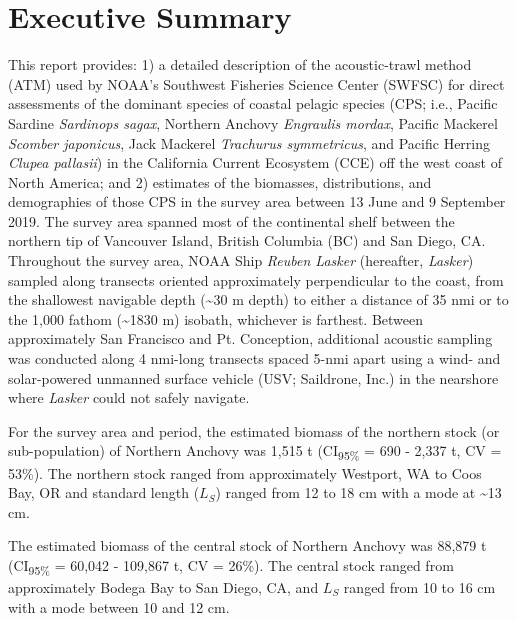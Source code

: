 \documentclass[]{article}
\title{}
\author{}
\date{}
\begin{document}
{
\setcounter{tocdepth}{3}
\tableofcontents
}
\newpage

\hypertarget{executive-summary}{%
\section*{Executive Summary}\label{executive-summary}}

This report provides: 1) a detailed description of the acoustic-trawl method (ATM) used by NOAA's Southwest Fisheries Science Center (SWFSC) for direct assessments of the dominant species of coastal pelagic species (CPS; i.e., Pacific Sardine \emph{Sardinops sagax}, Northern Anchovy \emph{Engraulis mordax}, Pacific Mackerel \emph{Scomber japonicus}, Jack Mackerel \emph{Trachurus symmetricus}, and Pacific Herring \emph{Clupea pallasii}) in the California Current Ecosystem (CCE) off the west coast of North America; and 2) estimates of the biomasses, distributions, and demographies of those CPS in the survey area between 13 June and 9 September 2019. The survey area spanned most of the continental shelf between the northern tip of Vancouver Island, British Columbia (BC) and San Diego, CA. Throughout the survey area, NOAA Ship \emph{Reuben Lasker} (hereafter, \emph{Lasker}) sampled along transects oriented approximately perpendicular to the coast, from the shallowest navigable depth (\textasciitilde30 m depth) to either a distance of 35 nmi or to the 1,000 fathom (\textasciitilde1830 m) isobath, whichever is farthest. Between approximately San Francisco and Pt. Conception, additional acoustic sampling was conducted along 4 nmi-long transects spaced 5-nmi apart using a wind- and solar-powered unmanned surface vehicle (USV; Saildrone, Inc.) in the nearshore where \emph{Lasker} could not safely navigate.

For the survey area and period, the estimated biomass of the northern stock (or sub-population) of Northern Anchovy was 1,515 t (CI\textsubscript{95\%} = 690 - 2,337 t, CV = 53\%). The northern stock ranged from approximately Westport, WA to Coos Bay, OR and standard length (\(L_S\)) ranged from 12 to 18 cm with a mode at \textasciitilde13 cm.

The estimated biomass of the central stock of Northern Anchovy was 88,879 t (CI\textsubscript{95\%} = 60,042 - 109,867 t, CV = 26\%). The central stock ranged from approximately Bodega Bay to San Diego, CA, and \(L_S\) ranged from 10 to 16 cm with a mode between 10 and 12 cm.
\end{document}
